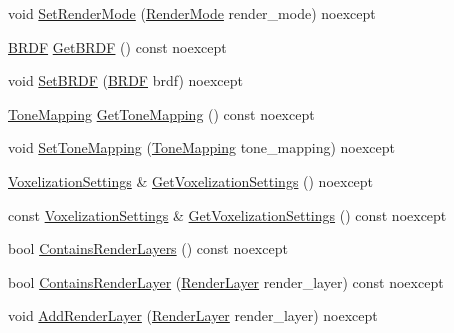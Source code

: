 \begin{DoxyCompactItemize}
\item 
void \mbox{\hyperlink{classmage_1_1rendering_1_1_camera_settings_aa4f29b081141c0acfb0e4d92eac81602}{Set\+Render\+Mode}} (\mbox{\hyperlink{namespacemage_1_1rendering_aeb14ce7610cc9391f4e01be027b91dcc}{Render\+Mode}} render\+\_\+mode) noexcept
\item 
\mbox{\hyperlink{namespacemage_1_1rendering_ab8fe8684ca4bd74ba3a394b00cf125b5}{B\+R\+DF}} \mbox{\hyperlink{classmage_1_1rendering_1_1_camera_settings_a3cb398b3bd69ae3a81e2e4c415d9e195}{Get\+B\+R\+DF}} () const noexcept
\item 
void \mbox{\hyperlink{classmage_1_1rendering_1_1_camera_settings_af2af3e55e876b0e2b037904e221f0bc4}{Set\+B\+R\+DF}} (\mbox{\hyperlink{namespacemage_1_1rendering_ab8fe8684ca4bd74ba3a394b00cf125b5}{B\+R\+DF}} brdf) noexcept
\item 
\mbox{\hyperlink{namespacemage_1_1rendering_a789e4b7d9a8cc831b065e9c6bb7430e9}{Tone\+Mapping}} \mbox{\hyperlink{classmage_1_1rendering_1_1_camera_settings_ae127ec7aa6c836b747d947200f847254}{Get\+Tone\+Mapping}} () const noexcept
\item 
void \mbox{\hyperlink{classmage_1_1rendering_1_1_camera_settings_ab5dc52d8f8d92cf3c4f6aca126f6dc47}{Set\+Tone\+Mapping}} (\mbox{\hyperlink{namespacemage_1_1rendering_a789e4b7d9a8cc831b065e9c6bb7430e9}{Tone\+Mapping}} tone\+\_\+mapping) noexcept
\item 
\mbox{\hyperlink{classmage_1_1rendering_1_1_voxelization_settings}{Voxelization\+Settings}} \& \mbox{\hyperlink{classmage_1_1rendering_1_1_camera_settings_ae30e0070a7376d99a9e3db5c24e45341}{Get\+Voxelization\+Settings}} () noexcept
\item 
const \mbox{\hyperlink{classmage_1_1rendering_1_1_voxelization_settings}{Voxelization\+Settings}} \& \mbox{\hyperlink{classmage_1_1rendering_1_1_camera_settings_a2e3906063aa11044dc325affee24aeb1}{Get\+Voxelization\+Settings}} () const noexcept
\item 
bool \mbox{\hyperlink{classmage_1_1rendering_1_1_camera_settings_aa6a33e3b5936e440af32d2ca3d65585f}{Contains\+Render\+Layers}} () const noexcept
\item 
bool \mbox{\hyperlink{classmage_1_1rendering_1_1_camera_settings_aab59f8b20a5d05fd23fff006ef741dac}{Contains\+Render\+Layer}} (\mbox{\hyperlink{namespacemage_1_1rendering_a466c2a441ea5b26e4625c2f34e021b3d}{Render\+Layer}} render\+\_\+layer) const noexcept
\item 
void \mbox{\hyperlink{classmage_1_1rendering_1_1_camera_settings_a921ff9ebe3ff05890f0e3dd8b71fcb7f}{Add\+Render\+Layer}} (\mbox{\hyperlink{namespacemage_1_1rendering_a466c2a441ea5b26e4625c2f34e021b3d}{Render\+Layer}} render\+\_\+layer) noexcept

\end{DoxyCompactItemize}
